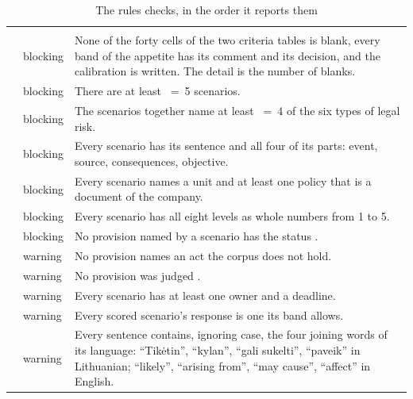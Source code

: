 \begin{xltabular}{\textwidth}{@{}L{37mm}L{17mm}Y@{}}
\caption{The rules  checks, in the order it reports them}\label{tab:programme:riskrules}\\
\toprule
{} &  &  \\
\midrule
\endfirsthead
\toprule
{} &  &  \\
\midrule
\endhead
\bottomrule
\endlastfoot
{} & blocking & None of the forty cells of the two criteria tables is blank, every band of the appetite has its comment and its decision, and the calibration is written. The detail is the number of blanks. \\
 & blocking & There are at least ~=~5 scenarios. \\
 & blocking & The scenarios together name at least ~=~4 of the six types of legal risk. \\
 & blocking & Every scenario has its sentence and all four of its parts: event, source, consequences, objective. \\
 & blocking & Every scenario names a unit and at least one policy that is a document of the company. \\
 & blocking & Every scenario has all eight levels as whole numbers from 1 to 5. \\
 & blocking & No provision named by a scenario has the status . \\
 & warning & No provision names an act the corpus does not hold. \\
 & warning & No provision was judged . \\
 & warning & Every scenario has at least one owner and a deadline. \\
 & warning & Every scored scenario's response is one its band allows. \\
 & warning & Every sentence contains, ignoring case, the four joining words of its language: \enquote{Tikėtin}, \enquote{kylan}, \enquote{gali sukelti}, \enquote{paveik} in Lithuanian; \enquote{likely}, \enquote{arising from}, \enquote{may cause}, \enquote{affect} in English. \\
\end{xltabular}

